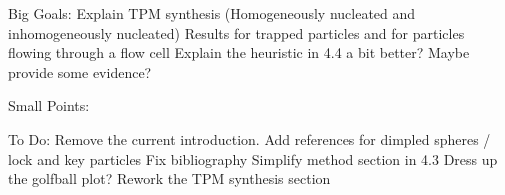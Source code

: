 Big Goals:
Explain TPM synthesis (Homogeneously nucleated and inhomogeneously nucleated)
Results for trapped particles and for particles flowing through a flow cell
Explain the heuristic in 4.4 a bit better? Maybe provide some evidence?
    
Small Points:

To Do:
    Remove the current introduction.
    Add references for dimpled spheres / lock and key particles
    Fix bibliography
    Simplify method section in 4.3
    Dress up the golfball plot?
    Rework the TPM synthesis section
